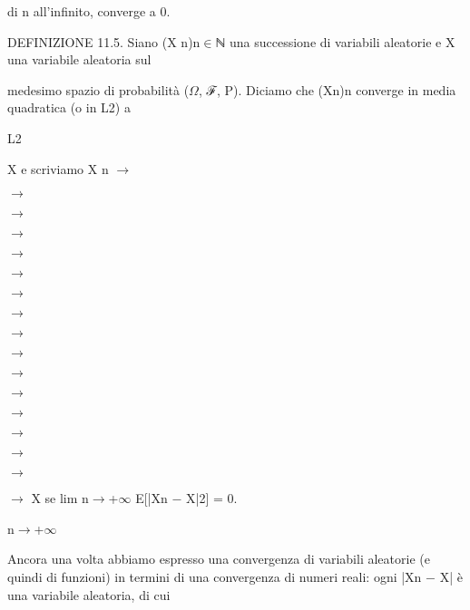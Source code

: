 \documentclass[a4paper,portrait,12pt]{article}
\begin{document}
\begin{flushleft}
di n all'infinito, converge a 0.
\end{flushleft}


\begin{flushleft}
DEFINIZIONE 11.5. Siano (X n)n$\in$ℕ una successione di variabili aleatorie e X una variabile aleatoria sul
\end{flushleft}


\begin{flushleft}
medesimo spazio di probabilit\`{a} ($\Omega$, ℱ, P). Diciamo che (Xn)n converge in media quadratica (o in L2) a
\end{flushleft}


\begin{flushleft}
L2
\end{flushleft}





\begin{flushleft}
X e scriviamo X n $\rightarrow$
\end{flushleft}


$\rightarrow$


$\rightarrow$


$\rightarrow$


$\rightarrow$


$\rightarrow$


$\rightarrow$


$\rightarrow$


$\rightarrow$


$\rightarrow$


$\rightarrow$


$\rightarrow$


$\rightarrow$


$\rightarrow$


$\rightarrow$


$\rightarrow$


\begin{flushleft}
$\rightarrow$ X se lim n$\rightarrow$+$\infty$ E[|Xn $-$ X|2] = 0.
\end{flushleft}


\begin{flushleft}
n$\rightarrow$+$\infty$
\end{flushleft}





\begin{flushleft}
Ancora una volta abbiamo espresso una convergenza di variabili aleatorie (e quindi di funzioni) in termini di una convergenza di numeri reali: ogni |Xn $-$ X| \`{e} una variabile aleatoria, di cui
\end{flushleft}
\end{document}
